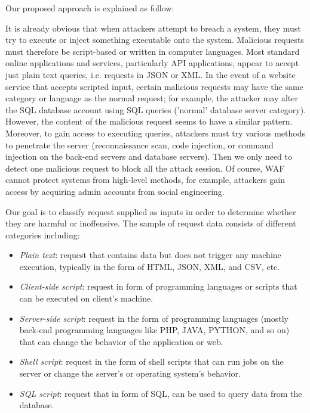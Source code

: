 Our proposed approach is explained as follow:

It is already obvious that when attackers attempt to breach a system, they must try to execute or inject something executable onto the system. Malicious requests must therefore be script-based or written in computer languages. Most standard online applications and services, particularly API applications, appear to accept just plain text queries, i.e. requests in JSON or XML. 
In the event of a website service that accepts scripted input, certain malicious requests may have the same category or language as the normal request; for example, the attacker may alter the SQL database account using SQL queries ('normal' database server category). However, the content of the malicious request seems to have a similar pattern. Moreover, to gain access to executing queries, attackers must try various methods to penetrate the server (reconnaissance scan, code injection, or command injection on the back-end servers and database servers). Then we only need to detect one malicious request to block all the attack session. Of course, WAF cannot protect systems from high-level methods, for example, attackers gain access by acquiring admin accounts from social engineering.

Our goal is to classify request supplied as inputs in order to determine whether they are harmful or inoffensive. The sample of request data consists of different categories including:
\begin{itemize}
    \item \emph{Plain text}: request that contains data but does not trigger any machine execution, typically in the form of HTML, JSON, XML, and CSV, etc.
    \item \emph{Client-side script}: request in form of programming languages or scripts that can be executed on client's machine.
    \item \emph{Server-side script}: request in the form of programming languages (mostly back-end programming languages like PHP, JAVA, PYTHON, and so on) that can change the behavior of the application or web.
    \item \emph{Shell script}: request in the form of shell scripts that can run jobs on the server or change the server's or operating system's behavior.
    \item \emph{SQL script}: request that in form of SQL, can be used to query data from the database.
\end{itemize}

